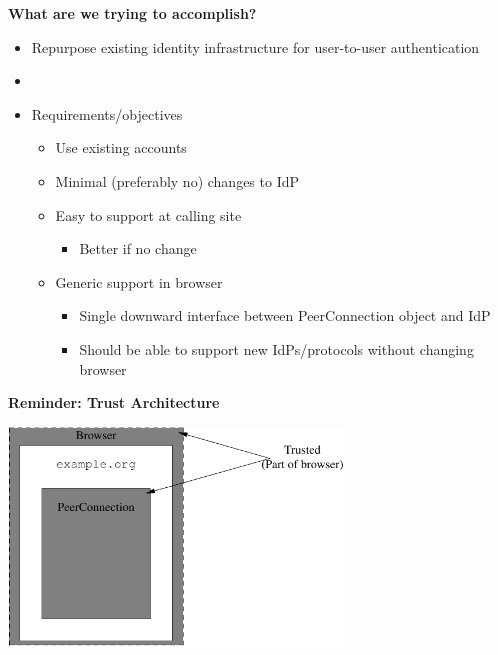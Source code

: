 \documentclass[helvetica]{seminar}
\newcommand{\heading}[1]{%
  \begin{center} 
    \large\bf 
    #1 
  \end{center} 
  \vspace{.4 in}}
\begin{document}
\begin{slide}
\heading{What are we trying to accomplish?}

\vspace{-.3in}
\begin{itemize}
\item Repurpose existing identity infrastructure for user-to-user authentication
\item []
\item Requirements/objectives
  \begin{itemize}
  \item Use existing accounts
  \item Minimal (preferably no) changes to IdP
  \item Easy to support at calling site
    \begin{itemize}
    \item Better if no change
    \end{itemize}

  \item Generic support in browser
    \begin{itemize}
    \item Single downward interface between PeerConnection object and IdP
    \item Should be able to support new IdPs/protocols without changing browser
    \end{itemize}
  \end{itemize}

\end{itemize}

\end{slide}

\begin{slide}
\heading{Reminder: Trust Architecture}

\begin{center}
\includegraphics[width=3.5in]{rtcweb-security-arch-no-idp}
\end{center}

\end{slide}
\end{document}
